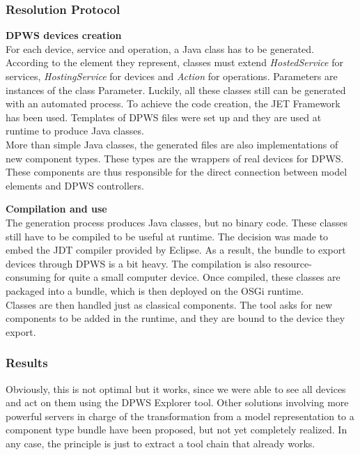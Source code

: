 \subsubsection{Resolution Protocol}

{\bf DPWS devices creation}\\
For each device, service and operation, a Java class has to be generated. According to the element they represent, classes must extend {\it HostedService} for services, {\it HostingService} for devices and {\it Action} for operations. Parameters are instances of the class \textsf{Parameter}. Luckily, all these classes still can be generated with an automated process. To achieve the code creation, the JET Framework has been used. Templates of DPWS files were set up and they are used at runtime to produce Java classes.\\
More than simple Java classes, the generated files are also implementations of new component types. These types are the wrappers of real devices for DPWS. These components are thus responsible for the direct connection between model elements and DPWS controllers.

{\bf Compilation and use}\\
The generation process produces Java classes, but no binary code. These classes still have to be compiled to be useful at runtime. The decision was made to embed the JDT compiler provided by Eclipse. As a result, the bundle to export devices through DPWS is a bit heavy. The compilation is also resource-consuming for quite a small computer device. Once compiled, these classes are packaged into a bundle, which is then deployed on the OSGi runtime.\\
Classes are then handled just as classical components. The tool asks for new components to be added in the runtime, and they are bound to the device  they export.\\

\subsubsection{Results}

Obviously, this is not optimal but it works, since we were able to see all devices and act on them using the DPWS Explorer tool. Other solutions involving more powerful servers in charge of the transformation from a model representation to a component type bundle have been proposed, but not yet completely realized. In any case, the principle is just to extract a tool chain that already works.\\


